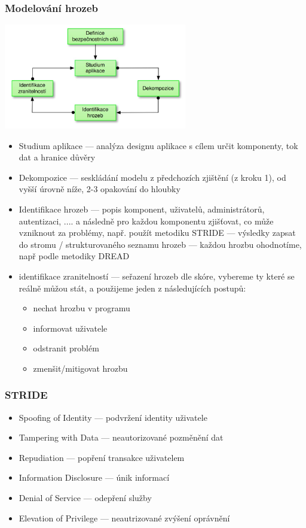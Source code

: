 \subsubsection*{Modelování hrozeb}
\includegraphics[width=0.6\textwidth]{img/OB-7_0.jpg}
\begin{itemize}

    \item Studium aplikace --- analýza designu aplikace s cílem určit komponenty, tok dat a hranice důvěry
    \item Dekompozice --- seskládání modelu z předchozích zjištění (z kroku 1), od vyšší úrovně níže, 2-3 opakování do hloubky
    \item Identifikace hrozeb --- popis komponent, uživatelů, administrátorů, autentizaci, .... a následně  pro každou komponentu zjišťovat, co může vzniknout za problémy, např. použít metodiku STRIDE --- výsledky zapsat do stromu / strukturovaného seznamu hrozeb --- každou hrozbu ohodnotíme, např podle metodiky DREAD
    \item identifikace zranitelností --- seřazení hrozeb dle skóre, vybereme ty které se reálně můžou stát, a použijeme jeden z následujících postupů:
    \begin{itemize}
        \item nechat hrozbu v programu
        \item informovat uživatele
        \item odstranit problém
        \item zmenšit/mitigovat hrozbu
    \end{itemize}
\end{itemize}

\subsubsection*{STRIDE}
\begin{itemize}
    \item Spoofing of Identity --- podvržení identity uživatele 
    \item Tampering with Data --- neautorizované pozměnění dat
    \item Repudiation --- popření transakce uživatelem 
    \item Information Disclosure --- únik informací
    \item Denial of Service --- odepření služby
    \item Elevation of Privilege --- neautrizované zvýšení oprávnění
\end{itemize}

